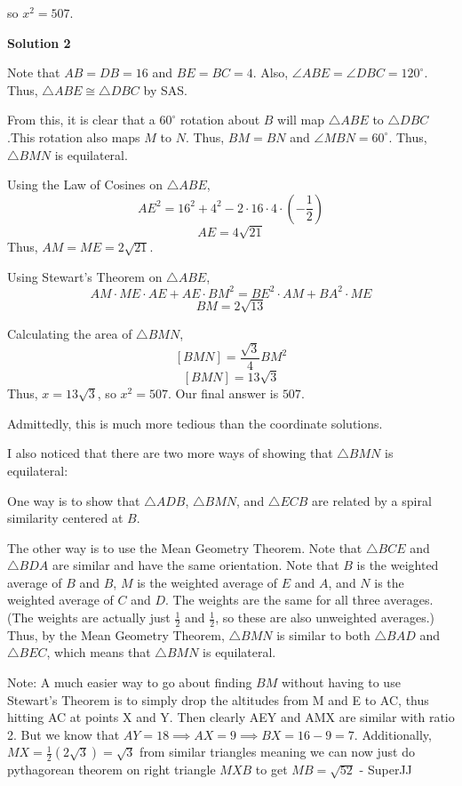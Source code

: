 \begin{enumerate}
 so $x^2=\boxed{507}.$




\textbf{Solution 2}

Note that $AB=DB=16$ and $BE=BC=4$. Also, $\angle ABE = \angle DBC = 120^{\circ}$. Thus, $\triangle ABE \cong \triangle DBC$ by SAS.

 From this, it is clear that a $60^{\circ}$ rotation about $B$ will map $\triangle ABE$ to $\triangle DBC$.This rotation also maps $M$ to $N$. Thus, $BM=BN$ and $\angle MBN=60^{\circ}$. Thus, $\triangle BMN$ is equilateral.

 Using the Law of Cosines on $\triangle ABE$,
 \[AE^2 = 16^2 + 4^2 - 2\cdot 16\cdot 4\cdot\left(-\frac{1}{2}\right)\]
 \[AE = 4\sqrt{21}\]Thus, $AM=ME=2\sqrt{21}$.

 Using Stewart's Theorem on $\triangle ABE$,
 \[AM\cdot ME\cdot AE + AE\cdot BM^2 = BE^2\cdot AM + BA^2\cdot ME\]
 \[BM = 2\sqrt{13}\]

 Calculating the area of $\triangle BMN$,
 \[[BMN] = \frac{\sqrt{3}}{4} BM^2\]
 \[[BMN] = 13\sqrt{3}\]Thus, $x=13\sqrt{3}$, so $x^2 = 507$. Our final answer is $\boxed{507}$.

 Admittedly, this is much more tedious than the coordinate solutions.

 I also noticed that there are two more ways of showing that $\triangle BMN$ is equilateral:

 One way is to show that $\triangle ADB$, $\triangle BMN$, and $\triangle ECB$ are related by a spiral similarity centered at $B$.

 The other way is to use the Mean Geometry Theorem. Note that $\triangle BCE$ and $\triangle BDA$ are similar and have the same orientation. Note that $B$ is the weighted average of $B$ and $B$, $M$ is the weighted average of $E$ and $A$, and $N$ is the weighted average of $C$ and $D$. The weights are the same for all three averages. (The weights are actually just $\frac{1}{2}$ and $\frac{1}{2}$, so these are also unweighted averages.) Thus, by the Mean Geometry Theorem, $\triangle BMN$ is similar to both $\triangle BAD$ and $\triangle BEC$, which means that $\triangle BMN$ is equilateral.

 
Note: A much easier way to go about finding $BM$ without having to use Stewart's Theorem is to simply drop the altitudes from M and E to AC, thus hitting AC at points X and Y. Then clearly AEY and AMX are similar with ratio 2. But we know that $AY = 18 \implies AX = 9 \implies BX = 16-9 = 7$. Additionally, $MX = \frac{1}{2} (2\sqrt{3}) = \sqrt{3}$ from similar triangles meaning we can now just do pythagorean theorem on right triangle $MXB$ to get $MB = \sqrt{52}$ - SuperJJ


\end{enumerate}
